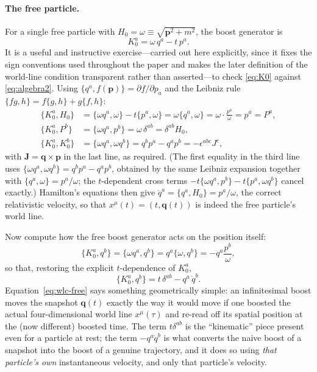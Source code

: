 \documentclass[11pt]{article}
\newcommand{\pb}[2]{\{#1,#2\}}
\newcommand{\bq}{\mathbf{q}}
\newcommand{\bp}{\mathbf{p}}
\newcommand{\bJ}{\mathbf{J}}
\begin{document}
\paragraph{The free particle.} For a single free particle with $H_0=\omega\equiv\sqrt{\bp^2+m^2}$, the boost generator is
\begin{equation}
K_0^a = \omega\, q^a - t\,p^a .
\label{eq:K0}
\end{equation}
It is a useful and instructive exercise---carried out here explicitly, since it fixes the sign conventions used throughout the paper and makes the later definition of the world-line condition transparent rather than asserted---to check \eqref{eq:K0} against \eqref{eq:algebra2}. Using $\pb{q^a}{f(\bp)}=\partial f/\partial p_a$ and the Leibniz rule $\pb{fg}{h}=f\pb{g}{h}+g\pb{f}{h}$:
\begin{align}
\pb{K_0^a}{H_0} &= \pb{\omega q^a}{\omega} - t\pb{p^a}{\omega} = \omega\pb{q^a}{\omega} = \omega\cdot\frac{p^a}{\omega} = p^a = P^a, \\
\pb{K_0^a}{P^b} &= \pb{\omega q^a}{p^b} = \omega\,\delta^{ab} = \delta^{ab}H_0, \\
\pb{K_0^a}{K_0^b} &= \pb{\omega q^a}{\omega q^b} = q^bp^a - q^ap^b = -\epsilon^{abc}J^c,
\end{align}
with $\bJ=\bq\times\bp$ in the last line, as required. (The first equality in the third line uses $\pb{\omega q^a}{\omega q^b}=q^bp^a-q^ap^b$, obtained by the same Leibniz expansion together with $\pb{q^a}{\omega}=p^a/\omega$; the $t$-dependent cross terms $-t\pb{\omega q^a}{p^b}-t\pb{p^a}{\omega q^b}$ cancel exactly.) Hamilton's equations then give $\dot q^a=\pb{q^a}{H_0}=p^a/\omega$, the correct relativistic velocity, so that $x^\mu(t)=(t,\bq(t))$ is indeed the free particle's world line.

Now compute how the free boost generator acts on the position itself:
\begin{equation}
\pb{K_0^a}{q^b} = \pb{\omega q^a}{q^b} = q^a\pb{\omega}{q^b} = -q^a\frac{p^b}{\omega},
\end{equation}
so that, restoring the explicit $t$-dependence of $K_0^a$,
\begin{equation}
\pb{K_0^a}{q^b} = t\,\delta^{ab} - q^a\,\dot q^b .
\label{eq:wlc-free}
\end{equation}
Equation~\eqref{eq:wlc-free} says something geometrically simple: an infinitesimal boost moves the snapshot $\bq(t)$ exactly the way it would move if one boosted the actual four-dimensional world line $x^\mu(\tau)$ and re-read off its spatial position at the (now different) boosted time. The term $t\delta^{ab}$ is the ``kinematic'' piece present even for a particle at rest; the term $-q^a\dot q^b$ is what converts the naive boost of a snapshot into the boost of a genuine trajectory, and it does so using \emph{that particle's own} instantaneous velocity, and only that particle's velocity.
\end{document}

